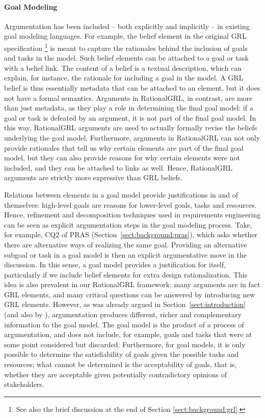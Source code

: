 \paragraph{Goal Modeling} Argumentation has been included -- both explicitly and implicitly -- in existing goal modeling languages. For example, the belief element in the original GRL specification \cite{Amyot:2010:EGM:1841349.1841356}\footnote{See also the brief discussion at the end of Section \ref{sect:background:grl}.} is meant to capture the rationales behind the inclusion of goals and tasks in the model. Such belief elements can be attached to a goal or task with a belief link. The content of a belief is a textual description, which can explain, for instance, the rationale for including a goal in the model. A GRL belief is thus essentially metadata that can be attached to an element, but it does not have a formal semantics. Arguments in RationalGRL, in contrast, are more than just metadata, as they play a role in determining the final goal model: if a goal or task is defeated by an argument, it is not part of the final goal model. In this way, RationalGRL arguments are used to actually formally revise the beliefs underlying the goal model. Furthermore, arguments in RationalGRL can not only provide rationales that tell us why certain elements are part of the final goal model, but they can also provide reasons for why certain elements were not included, and they can be attached to links as well. Hence, RationalGRL arguments are strictly more expressive than GRL beliefs. 

Relations between elements in a goal model provide justifications in and of themselves: high-level goals are reasons for lower-level goals, tasks and resources. Hence, refinement and decomposition techniques used in requirements engineering \cite{van2001goal} can be seen as explicit argumentation steps in the goal modeling process. Take, for example, CQ2 of PRAS (Section~\ref{sect:background:pras}), which asks whether there are alternative ways of realizing the same goal. Providing an alternative subgoal or task in a goal model is then an explicit argumentative move in the discussion. In this sense, a goal model provides a justification for itself, particularly if we include belief elements for extra design rationalization. This idea is also prevalent in our RationalGRL framework: many arguments are in fact GRL elements, and many critical questions can be answered by introducing new GRL elements. However, as was already argued in Section~\ref{sect:introduction} (and also by \cite{Jureta:RE2008}), argumentation produces different, richer and complementary information to the goal model. The goal model is the product of a process of argumentation, and does not include, for example, goals and tasks that were at some point considered but discarded. Furthermore, for goal models, it is only possible to determine the satisfiability of goals given the possible tasks and resources; what cannot be determined is the acceptability of goals, that is, whether they are acceptable given potentially contradictory opinions of stakeholders.  


